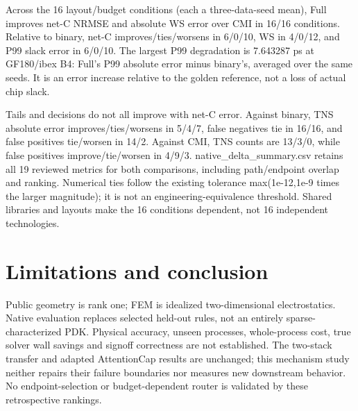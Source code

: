 \documentclass[10pt,twocolumn]{article}
\begin{document}
\begin{table}[!ht]\centering\small{}\caption{Archived native CMI, binary and Full. First average three data seeds per layout/budget, then eight layouts. Timing values in ps are reference errors; averaged per-run P99 is not a pooled percentile.}\end{table}


Across the 16 layout/budget conditions (each a three-data-seed mean), Full improves net-C NRMSE and absolute WS error over CMI in 16/16 conditions. Relative to binary, net-C improves/ties/worsens in 6/0/10, WS in 4/0/12, and P99 slack error in 6/0/10. The largest P99 degradation is 7.643287 ps at GF180/ibex B4: Full's P99 absolute error minus binary's, averaged over the same seeds. It is an error increase relative to the golden reference, not a loss of actual chip slack.

Tails and decisions do not all improve with net-C error. Against binary, TNS absolute error improves/ties/worsens in 5/4/7, false negatives tie in 16/16, and false positives tie/worsen in 14/2. Against CMI, TNS counts are 13/3/0, while false positives improve/tie/worsen in 4/9/3. native\_delta\_summary.csv retains all 19 reviewed metrics for both comparisons, including path/endpoint overlap and ranking. Numerical ties follow the existing tolerance max(1e-12,1e-9 times the larger magnitude); it is not an engineering-equivalence threshold. Shared libraries and layouts make the 16 conditions dependent, not 16 independent technologies.

\section*{Limitations and conclusion}

Public geometry is rank one; FEM is idealized two-dimensional electrostatics. Native evaluation replaces selected held-out rules, not an entirely sparse-characterized PDK. Physical accuracy, unseen processes, whole-process cost, true solver wall savings and signoff correctness are not established. The two-stack transfer and adapted AttentionCap results are unchanged; this mechanism study neither repairs their failure boundaries nor measures new downstream behavior. No endpoint-selection or budget-dependent router is validated by these retrospective rankings.
\end{document}
